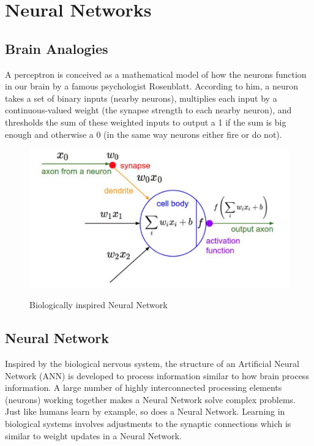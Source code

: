 \pagebreak

\section{Neural Networks}
\subsection{Brain Analogies}

A perceptron is conceived as a mathematical model of how the neurons function in our brain by a famous psychologist Rosenblatt. According to him, a neuron  takes a set of binary inputs (nearby neurons), multiplies each input by a continuous-valued weight (the synapse strength to each nearby neuron), and thresholds the sum of these weighted inputs to output a 1 if the sum is big enough and otherwise a 0 (in the same way neurons either fire or do not).

\begin{figure}[H]
\begin{center}
\includegraphics[height=.28\textheight]{Chapter2/Figs/NeuralNetwork.png}
\label{fig:Neural_Network}
\caption{Biologically inspired Neural Network \cite{karparthy}}
\end{center}
\end{figure}

\subsection{Neural Network}

Inspired by the biological nervous system, the structure of an Artificial Neural Network (ANN) is developed to process information similar to how brain process information. A large number of highly interconnected processing elements (neurons) working together makes a Neural Network solve complex problems. Just like humans learn by example, so does a Neural Network. Learning in biological systems involves adjustments to the synaptic connections which is similar to weight updates in a Neural Network. 

